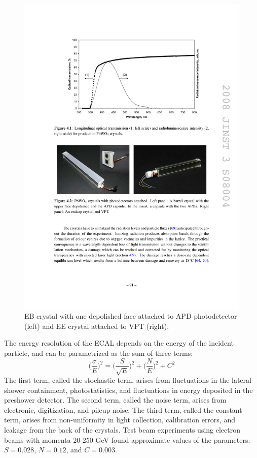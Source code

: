 \begin{figure}[tbh]
\centering
\includegraphics[width=6in]{figures/crystalmodules.pdf}
\caption{EB crystal with one depolished face attached to APD photodetector (left) and EE crystal attached to VPT (right).}
\label{fig:crystalmodules}
\end{figure}

\indent The energy resolution of the ECAL depends on the energy of the incident particle, and can be parametrized as the sum of three terms:
\begin{equation}
\bigg(\frac{\sigma}{E}\bigg)^2 = \bigg(\frac{S}{\sqrt{E}}\bigg)^2 + \bigg(\frac{N}{E}\bigg)^2 + C^2
\end{equation}
The first term, called the stochastic term, arises from fluctuations in the lateral shower containment, photostatistics, and fluctuations in energy deposited in the preshower detector. The second term, called the noise term, arises from electronic, digitization, and pileup noise. The third term, called the constant term, arises from non-uniformity in light collection, calibration errors, and leakage from the back of the crystals. Test beam experiments using electron beams with momenta 20-250 GeV found approximate values of the parameters: $S=0.028$, $N=0.12$, and $C=0.003$. 

